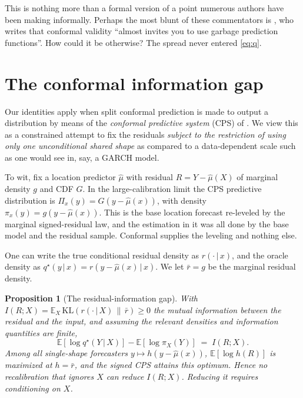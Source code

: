 \documentclass[11pt]{article}
\newtheorem{proposition}{Proposition}
\theoremstyle{definition}
\newcommand{\E}{\mathbb{E}}
\newcommand{\KL}{\mathrm{KL}}
\newcommand{\given}{\,\vert\,}
\begin{document}
This is nothing more than a formal version of a point numerous authors have been making
informally. Perhaps the most blunt of these commentators is \citet{recht2024cover}, who
writes that conformal validity ``almost invites you to use garbage prediction functions''.
How could it be otherwise? The spread never entered \eqref{eq:q}.

\section{The conformal information gap}

Our identities apply when split conformal prediction is made to output a distribution by means
of the \emph{conformal predictive system} (CPS) of \citet{vovk2019nonparametric}. We view this
 as a constrained attempt to fix the residuals {\em subject to the
restriction of using only one unconditional shared shape} as compared to a data-dependent
scale such as one would see in, say, a GARCH model. 

To wit, fix a location predictor $\hat\mu$ with residual $R=Y-\hat\mu(X)$ of marginal density $g$
and CDF $G$. In the large-calibration limit the CPS predictive distribution is
$\Pi_x(y)=G(y-\hat\mu(x))$, with density $\pi_x(y)=g(y-\hat\mu(x))$. This is the base
location forecast re-leveled by the marginal signed-residual law, and the estimation in it
was all done by the base model and the residual sample. Conformal supplies the leveling and
nothing else. 

One can write the true conditional residual density as $r(\cdot\given x)$, and the
oracle density as $q^\star(y\given x)=r(y-\hat\mu(x)\given x)$. We let $\bar r=g$ be the
marginal residual density.

\begin{proposition}[The residual-information gap]\label{prop:gap}
With $I(R;X)=\E_X\,\KL(r(\cdot\given X)\,\|\,\bar r)\ge 0$ the mutual information between
the residual and the input, and assuming the relevant densities and information quantities
are finite,
\begin{equation}\label{eq:gap}
  \E[\log q^\star(Y\given X)]-\E[\log \pi_X(Y)] \;=\; I(R;X).
\end{equation}
Among all single-shape forecasters $y\mapsto h(y-\hat\mu(x))$, $\E[\log h(R)]$ is maximized
at $h=\bar r$, and the signed CPS attains this optimum. Hence no recalibration that ignores
$X$ can reduce $I(R;X)$. Reducing it requires conditioning on $X$.
\end{proposition}
\end{document}
